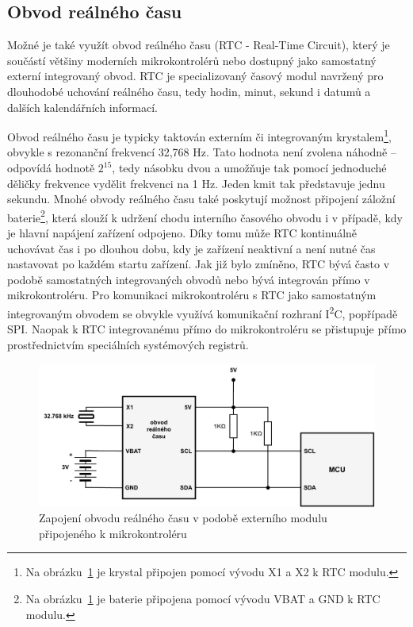\subsection{Obvod reálného času}
\label{real_time_circuit}
Možné je také využít obvod reálného času (RTC - Real-Time Circuit), který je součástí většiny moderních mikrokontrolérů nebo dostupný jako samostatný externí integrovaný obvod. RTC je specializovaný časový modul navržený pro dlouhodobé uchování reálného času, tedy hodin, minut, sekund i datumů a dalších kalendářních informací.

Obvod reálného času je typicky taktován externím či integrovaným krystalem\footnote{Na obrázku~\ref{fig:real-time-circuit} je krystal připojen pomocí vývodu X1 a X2 k RTC modulu.}, obvykle s rezonanční frekvencí 32,768 Hz. Tato hodnota není zvolena náhodně – odpovídá hodnotě $2^{15}$, tedy násobku dvou a umožňuje tak pomocí jednoduché děličky frekvence vydělit frekvenci na 1 Hz. Jeden kmit tak představuje jednu sekundu. Mnohé obvody reálného času také poskytují možnost připojení záložní baterie\footnote{Na obrázku~\ref{fig:real-time-circuit} je baterie připojena pomocí vývodu VBAT a GND k RTC modulu.}, která slouží k udržení chodu interního časového obvodu i v případě, kdy je hlavní napájení zařízení odpojeno. Díky tomu může RTC kontinuálně uchovávat čas i po dlouhou dobu, kdy je zařízení neaktivní a není nutné čas nastavovat po každém startu zařízení. Jak již bylo zmíněno, RTC bývá často v podobě samostatných integrovaných obvodů nebo bývá integrován přímo v mikrokontroléru. Pro komunikaci mikrokontroléru s RTC jako samostatným integrovaným obvodem se obvykle využívá komunikační rozhraní I\textsuperscript{2}C, popřípadě SPI. Naopak k RTC integrovanému přímo do mikrokontroléru se přistupuje přímo prostřednictvím speciálních systémových registrů. \cite{jameco_choosing_right_real_time_clock_chip_or_module, yxc_role_of_32768_freq_in_the_circuit, medium_rtc}

\begin{figure}[h]
    \centering
    \includegraphics[width=1.00\textwidth]{obrazky-figures/real_time_circuit.pdf}
    
    \caption{Zapojení obvodu reálného času v podobě externího modulu připojeného k mikrokontroléru \cite{embed_journal_interfacing_rtc_with_microcontroler}}
    \label{fig:real-time-circuit}
\end{figure}

